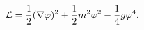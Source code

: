 \begin{equation}
{\cal
L}={1\over2}(\nabla\varphi)^2+{1\over2}m^2\varphi^2-{1\over4}g\varphi^4.
\label{e28}
\end{equation}


